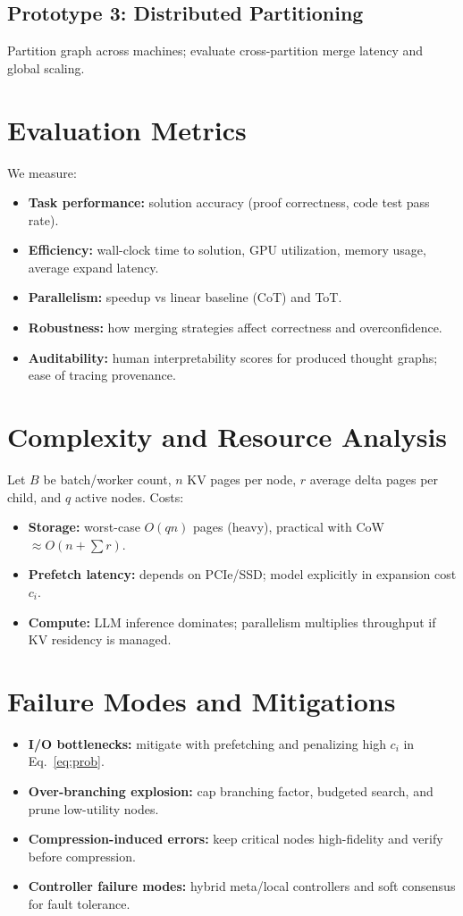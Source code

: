 \documentclass[11pt,onecolumn,letterpaper]{article}
\begin{document}
\subsection{Prototype 3: Distributed Partitioning}
Partition graph across machines; evaluate cross-partition merge latency and global scaling.

\section{Evaluation Metrics}
We measure:
\begin{itemize}[nosep]
  \item \textbf{Task performance:} solution accuracy (proof correctness, code test pass rate).
  \item \textbf{Efficiency:} wall-clock time to solution, GPU utilization, memory usage, average expand latency.
  \item \textbf{Parallelism:} speedup vs linear baseline (CoT) and ToT.
  \item \textbf{Robustness:} how merging strategies affect correctness and overconfidence.
  \item \textbf{Auditability:} human interpretability scores for produced thought graphs; ease of tracing provenance.
\end{itemize}

\section{Complexity and Resource Analysis}
Let \(B\) be batch/worker count, \(n\) KV pages per node, \(r\) average delta pages per child, and \(q\) active nodes. Costs:
\begin{itemize}[nosep]
  \item \textbf{Storage:} worst-case \(O(q n)\) pages (heavy), practical with CoW \(\approx O(n + \sum r)\).
  \item \textbf{Prefetch latency:} depends on PCIe/SSD; model explicitly in expansion cost \(c_i\).
  \item \textbf{Compute:} LLM inference dominates; parallelism multiplies throughput if KV residency is managed.
\end{itemize}

\section{Failure Modes and Mitigations}
\begin{itemize}[nosep]
  \item \textbf{I/O bottlenecks:} mitigate with prefetching and penalizing high \(c_i\) in Eq.~\ref{eq:prob}.
  \item \textbf{Over-branching explosion:} cap branching factor, budgeted search, and prune low-utility nodes.
  \item \textbf{Compression-induced errors:} keep critical nodes high-fidelity and verify before compression.
  \item \textbf{Controller failure modes:} hybrid meta/local controllers and soft consensus for fault tolerance.
\end{itemize}
\end{document}
